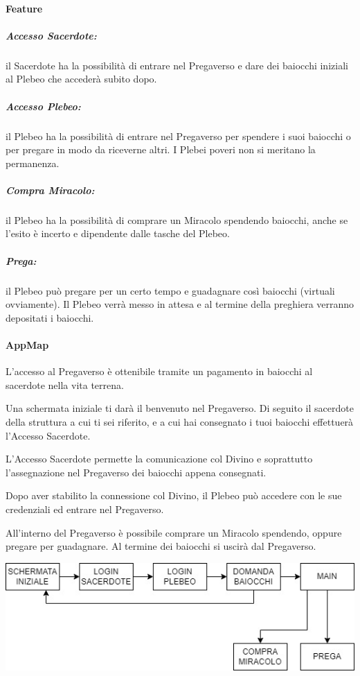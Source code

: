 \documentclass[a4paper]{report}
\begin{document}
        \paragraph{Feature}
            \subparagraph{Accesso Sacerdote:} il Sacerdote ha la possibilità di entrare nel Pregaverso e dare dei baiocchi iniziali al Plebeo che accederà subito dopo.
            \subparagraph{Accesso Plebeo:} il Plebeo ha la possibilità di entrare nel Pregaverso per spendere i suoi baiocchi o per pregare in modo da riceverne altri. I Plebei poveri non si meritano la permanenza.
            \subparagraph{Compra Miracolo:} il Plebeo ha la possibilità di comprare un Miracolo spendendo baiocchi, anche se l'esito è incerto e dipendente dalle tasche del Plebeo.
            \subparagraph{Prega:} il Plebeo può pregare per un certo tempo e guadagnare così baiocchi (virtuali ovviamente). Il Plebeo verrà messo in attesa e al termine della preghiera verranno depositati i baiocchi.
        
        \newpage

        \paragraph{AppMap}
            L'accesso al Pregaverso è ottenibile tramite un pagamento in baiocchi al sacerdote nella vita terrena.

            Una schermata iniziale ti darà il benvenuto nel Pregaverso. Di seguito il sacerdote della struttura a cui ti sei riferito, e a cui hai consegnato i tuoi baiocchi effettuerà l'Accesso Sacerdote.

            L'Accesso Sacerdote permette la comunicazione col Divino e soprattutto l'assegnazione nel Pregaverso dei baiocchi appena consegnati.

            Dopo aver stabilito la connessione col Divino, il Plebeo può accedere con le sue credenziali ed entrare nel Pregaverso.

            All'interno del Pregaverso è possibile comprare un Miracolo spendendo, oppure pregare per guadagnare. Al termine dei baiocchi si uscirà dal Pregaverso.

            \vspace*{1cm}

            \includegraphics[scale=0.95]{sitemap.jpg}
\end{document}
